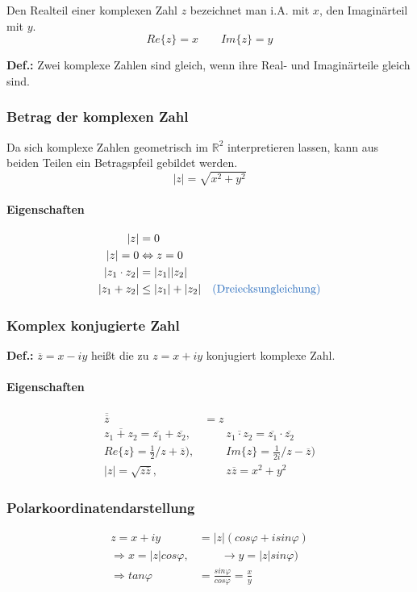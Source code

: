 \documentclass[12pt,a4paper]{article}%
\numberwithin{equation}{section}
\newcommand{\R}{\mathbb{R}} %
\newcommand{\subsubsubsection}{\paragraph}
\def\colBlue#1{\begingroup\color{NavyBlue}{#1}\endgroup}
\def\defF{\textbf{Def.: }}
\numberwithin{equation}{subsection}
\begin{document}
	Den Realteil einer komplexen Zahl $z$ bezeichnet man i.A. mit $x$, den Imaginärteil mit $y$.
	\begin{equation}
	  Re\{z\} = x \qquad Im\{z\} = y
	\end{equation}
	
	\defF \glqq Zwei komplexe Zahlen sind gleich, wenn ihre Real- und Imaginärteile gleich sind. \grqq \cite{HM12}
	
		\subsubsection{Betrag der komplexen Zahl}
		
		Da sich komplexe Zahlen geometrisch im $\R^2$ interpretieren lassen, kann aus beiden Teilen ein Betragspfeil gebildet werden.
		\begin{equation}
		  |z| = \sqrt{x^2 + y^2}
		\end{equation}
		
			\subsubsubsection{Eigenschaften}
			\begin{align}
				|z| &= 0\\
				|z| = 0 &\Leftrightarrow z = 0\\
				|z_1 \cdot z_2| &= |z_1| |z_2|\\
				|z_1 + z_2| &\leq |z_1| + |z_2| \quad \text{\colBlue{(Dreiecksungleichung)}}
			\end{align}
		
		\subsubsection{Komplex konjugierte Zahl}
		\defF \glqq $\overline{z} = x -iy$ heißt die zu $z = x + iy$ konjugiert komplexe Zahl. \grqq \cite{HM12}
		
			\subsubsubsection{Eigenschaften}
			\begin{align}
				\overline{\overline{z}} &= z \\
				\overline{z_1 + z_2} = \overline{z_1} + \overline{z_2},&\qquad \overline{z_1 \cdot z_2} = \overline{z_1} \cdot \overline{z_2} \\
				Re\{z\} = \frac{1}{2} /z + \overline{z}), &\qquad Im\{z\} = \frac{1}{2i} /z - \overline{z})\\
				|z| = \sqrt{z \overline{z}}, &\qquad z\overline{z} = x^2 + y^2
			\end{align}
			
		\subsubsection{Polarkoordinatendarstellung}
		\begin{align}
			z = x + iy &= |z|(cos\varphi + isin\varphi)\\
			\Rightarrow x = |z| cos\varphi, &\qquad \rightarrow y = |z| sin\varphi) \nonumber\\
			\Rightarrow tan \varphi &= \frac{sin \varphi}{cos \varphi} = \frac{x}{y}
		\end{align}
		
\end{document}
